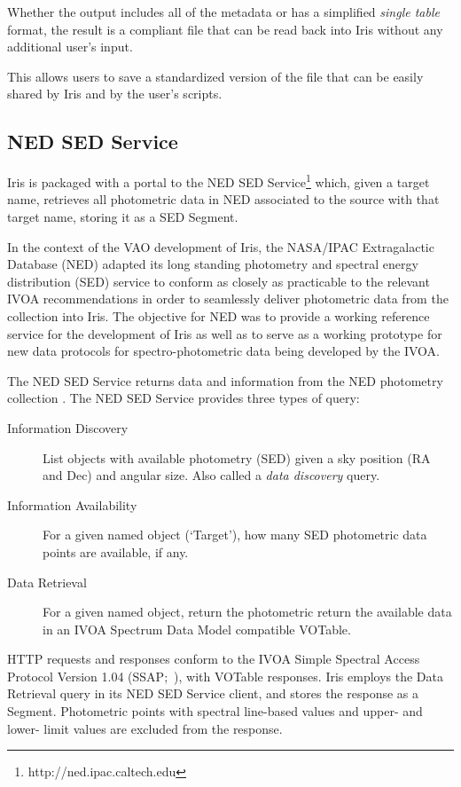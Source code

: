 \documentclass[5p]{elsarticle}
\begin{document}
Whether the output includes all of the metadata or has a simplified \emph{single table} format, the result is a compliant file that can be read back into Iris without any additional user's input.

This allows users to save a standardized version of the file that can be easily shared by Iris and by the user's scripts.

\subsection{NED SED Service}
\label{subsec:ned}

Iris is packaged with a portal to the NED SED Service\footnote{http://ned.ipac.caltech.edu} which, given a target name, retrieves all photometric data in NED associated to the source with that target name, storing it as a SED Segment.

In the context of the VAO development of Iris, the NASA/IPAC Extragalactic Database (NED) adapted its long standing photometry and spectral energy distribution (SED) service to conform as closely as practicable to the relevant IVOA recommendations in order to seamlessly deliver photometric data from the collection into Iris. The objective for NED was to provide a working reference service for the development of Iris as well as to serve as a working prototype for new data protocols for spectro-photometric data being developed by the IVOA.

The NED SED Service returns data and information from the NED photometry collection \citep{2007ASPC..376..153M}. The NED SED Service provides three types of query:
\begin{description}
 \item[Information Discovery] List objects with available photometry (SED) given a sky position (RA and Dec) and angular size.  Also called a \emph{data discovery} query.
 \item[Information Availability] For a given named object (`Target'), how many SED photometric data points are available, if any.
 \item[Data Retrieval] For a given named object, return the photometric return the available data in an IVOA Spectrum Data Model compatible VOTable.
\end{description}

HTTP requests and responses conform to the IVOA Simple Spectral Access Protocol Version 1.04 (SSAP;~\citep{2012arXiv1203.5725T}), with VOTable responses. Iris employs the Data Retrieval query in its NED SED Service client, and stores the response as a Segment. Photometric points with spectral line-based values and upper- and lower- limit values are excluded from the response.
\end{document}
